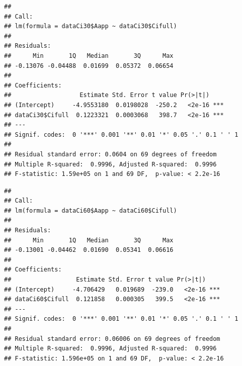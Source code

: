 \documentclass[
]{krantz}
\makeatletter
\newenvironment{Shaded}{\begin{snugshade}}{\end{snugshade}}
\newcommand{\DecValTok}[1]{\textcolor[rgb]{0.00,0.00,0.81}{#1}}
\newcommand{\KeywordTok}[1]{\textcolor[rgb]{0.13,0.29,0.53}{\textbf{#1}}}
\newcommand{\NormalTok}[1]{#1}
\newcommand{\OperatorTok}[1]{\textcolor[rgb]{0.81,0.36,0.00}{\textbf{#1}}}
\newcommand{\StringTok}[1]{\textcolor[rgb]{0.31,0.60,0.02}{#1}}
\newenvironment{kframe}{%
\medskip{}
\setlength{\fboxsep}{.8em}
 \def\at@end@of@kframe{}%
 \ifinner\ifhmode%
  \def\at@end@of@kframe{\end{minipage}}%
  \begin{minipage}{\columnwidth}%
 \fi\fi%
 \def\FrameCommand##1{\hskip\@totalleftmargin \hskip-\fboxsep
 \colorbox{shadecolor}{##1}\hskip-\fboxsep
     \hskip-\linewidth \hskip-\@totalleftmargin \hskip\columnwidth}%
 \MakeFramed {\advance\hsize-\width
   \@totalleftmargin\z@ \linewidth\hsize
   \@setminipage}}%
 {\par\unskip\endMakeFramed%
 \at@end@of@kframe}
\renewenvironment{Shaded}{\begin{kframe}}{\end{kframe}}
\makeatother
\begin{document}
\begin{verbatim}
## 
## Call:
## lm(formula = dataCi30$Aapp ~ dataCi30$Cifull)
## 
## Residuals:
##      Min       1Q   Median       3Q      Max 
## -0.13076 -0.04488  0.01699  0.05372  0.06654 
## 
## Coefficients:
##                   Estimate Std. Error t value Pr(>|t|)    
## (Intercept)     -4.9553180  0.0198028  -250.2   <2e-16 ***
## dataCi30$Cifull  0.1223321  0.0003068   398.7   <2e-16 ***
## ---
## Signif. codes:  0 '***' 0.001 '**' 0.01 '*' 0.05 '.' 0.1 ' ' 1
## 
## Residual standard error: 0.0604 on 69 degrees of freedom
## Multiple R-squared:  0.9996,	Adjusted R-squared:  0.9996 
## F-statistic: 1.59e+05 on 1 and 69 DF,  p-value: < 2.2e-16
\end{verbatim}

\begin{Shaded}
\end{Shaded}

\begin{verbatim}
## 
## Call:
## lm(formula = dataCi60$Aapp ~ dataCi60$Cifull)
## 
## Residuals:
##      Min       1Q   Median       3Q      Max 
## -0.13001 -0.04462  0.01690  0.05341  0.06616 
## 
## Coefficients:
##                  Estimate Std. Error t value Pr(>|t|)    
## (Intercept)     -4.706429   0.019689  -239.0   <2e-16 ***
## dataCi60$Cifull  0.121858   0.000305   399.5   <2e-16 ***
## ---
## Signif. codes:  0 '***' 0.001 '**' 0.01 '*' 0.05 '.' 0.1 ' ' 1
## 
## Residual standard error: 0.06006 on 69 degrees of freedom
## Multiple R-squared:  0.9996,	Adjusted R-squared:  0.9996 
## F-statistic: 1.596e+05 on 1 and 69 DF,  p-value: < 2.2e-16
\end{verbatim}

\begin{Shaded}
\end{Shaded}
\end{document}
